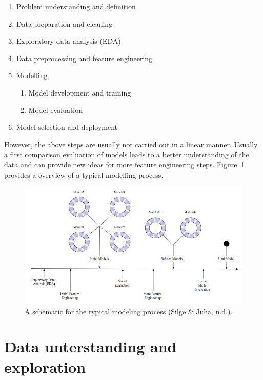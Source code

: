 \documentclass[
  letterpaper,
  DIV=11,
  numbers=noendperiod]{scrreprt}
\providecommand{\tightlist}{%
  \setlength{\itemsep}{0pt}\setlength{\parskip}{0pt}}\usepackage{longtable,booktabs,array}
\begin{document}
\begin{enumerate}
\def\labelenumi{\arabic{enumi}.}
\tightlist
\item
  Problem understanding and definition
\item
  Data preparation and cleaning
\item
  Exploratory data analysis (EDA)
\item
  Data preprocessing and feature engineering
\item
  Modelling

  \begin{enumerate}
  \def\labelenumii{\arabic{enumii}.}
  \item
    Model development and training
  \item
    Model evaluation
  \end{enumerate}
\item
  Model selection and deployment
\end{enumerate}

However, the above steps are usually not carried out in a linear manner.
Usually, a first comparison evaluation of models leads to a better
understanding of the data and can provide new ideas for more feature
engineering steps. Figure~\ref{fig-modelling-process} provides a
overview of a typical modelling process.

\begin{figure}

{\centering \includegraphics{./figures/03-fig-modelling-process.png}

}

\caption{\label{fig-modelling-process}A schematic for the typical
modeling process (Silge \& Julia, n.d.).}

\end{figure}

\hypertarget{sec-data-unterstanding-and-exploration}{%
\section{Data unterstanding and
exploration}\label{sec-data-unterstanding-and-exploration}}
\end{document}
